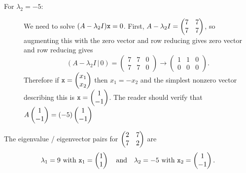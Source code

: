 \begin{example}
\begin{description}
    \item[For $\lambda_2=-5$:] We need to solve $(A - \lambda_2 I) \texttt{x} = 0$.
        First, $A - \lambda_2 I = \begin{pmatrix} 7 & 7 \\ 7 & 7 \end{pmatrix}$, so augmenting this with the
        zero vector and row reducing gives
        zero vector and row reducing gives
        \[ (A-\lambda_2 I \, | \, 0) = \left( \begin{array}{cc|c} 7 & 7 & 0 \\ 7 & 7 & 0
            \end{array} \right) \to \left( \begin{array}{cc|c} 1 & 1 & 0 \\ 0 & 0 & 0
            \end{array} \right). \]
        Therefore if $\texttt{x} = \begin{pmatrix} x_1 \\ x_2 \end{pmatrix}$ then $x_1 = -x_2$ and the simplest
        nonzero vector describing this is $\texttt{x} = \begin{pmatrix} 1 \\ -1 \end{pmatrix}$.  The reader should
        verify that $A\begin{pmatrix} 1 \\ -1 \end{pmatrix} = (-5) \begin{pmatrix} 1 \\ -1 \end{pmatrix}$ 
\end{description}
The eigenvalue / eigenvector pairs for $\begin{pmatrix} 2 & 7 \\ 7 & 2 \end{pmatrix}$ are
\[ \lambda_1 = 9 \text{ with } \texttt{x}_1 = \begin{pmatrix} 1 \\ 1 \end{pmatrix} \quad \text{and} \quad \lambda_2 =
    -5 \text{ with } \texttt{x}_2 = \begin{pmatrix} 1 \\ -1 \end{pmatrix}. \]
\end{example}

